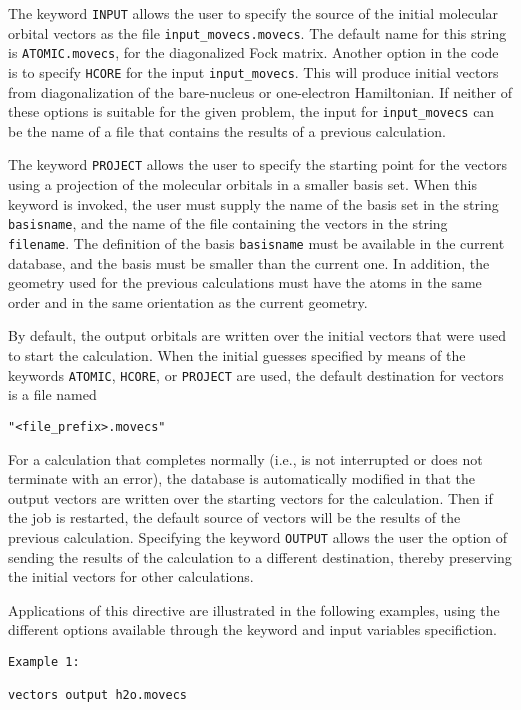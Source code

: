 The keyword \verb+INPUT+ allows the user to specify the source of the 
initial molecular orbital vectors as the file \verb+input_movecs.movecs+.  
The default name for this string is \verb+ATOMIC.movecs+, for the diagonalized
Fock matrix.  Another option in the code is to specify \verb+HCORE+ for
the input \verb+input_movecs+.  This will produce initial vectors from
diagonalization of the bare-nucleus or one-electron Hamiltonian.  If 
neither of these options is suitable for the given problem, the input
for \verb+input_movecs+ can be the name of a file that contains the
results of a previous calculation.

The keyword \verb+PROJECT+ allows the user to specify the starting point
for the vectors using a projection of the molecular orbitals in a smaller
basis set.  When this keyword is invoked, the user must supply the name
of the basis set in the string \verb+basisname+, and the name of the file 
containing the vectors in the string \verb+filename+.  The definition of 
the basis \verb+basisname+ 
must be available in the current database, and the basis must be
smaller than the current one.  In addition, the geometry used for the
previous calculations must have the atoms in the same order and in the
same orientation as the current geometry.
 
By default, the output orbitals are written over the initial vectors that
were used to start the calculation.  When the initial guesses specified
by means of the keywords \verb+ATOMIC+, \verb+HCORE+, or \verb+PROJECT+ 
are used, the default destination for
vectors is a file named

\verb+"<file_prefix>.movecs"+

For a calculation 
that completes normally (i.e., is not interrupted or does not terminate
with an error), the database is automatically modified in that the output
vectors are written over the starting vectors for the calculation.  Then
if the job is restarted,
 the default source of vectors will be the results 
of the previous calculation.  Specifying the keyword \verb+OUTPUT+ allows
the user the option of sending the results of the calculation to a different
destination, thereby preserving the initial vectors for other calculations.

Applications of this directive are illustrated in the following examples,
using the different options available through the keyword and input variables
specifiction.

\begin{verbatim}
Example 1:

vectors output h2o.movecs
\end{verbatim}

